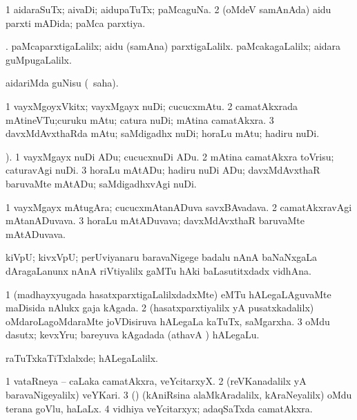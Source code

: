 \bentry
{}
\gl{\gu}
\bmng
\bnum
\num{1} aidaraSuTx; aivaDi; aidupaTuTx; paMcaguNa. 
\num{2} (oMdeV samAnAda) aidu parxti mADida; paMca parxtiya. 
\enum
\emng

\noindent
\gl{\pagu}
\expl{}
\bmng
{}. 
\banum
{} paMcaparxtigaLalilx; aidu (samAna) parxtigaLalilx. 
 paMcakagaLalilx; aidara guMpugaLalilx. 
\eanum
\emng
\eentry

\bentry
{}
\gl{\sakirx}
\expl{}
\bmng
aidariMda guNisu (\akirx\ saha). 
\emng
\eentry

\bentry
{}
\gl{\nA }
\bmng
\bnum
\num{1} vayxMgoyxVkitx; vayxMgayx nuDi; cucucxmAtu. 
\num{2} camatAkxrada mAtineVTu;curuku mAtu; catura nuDi; mAtina camatAkxra. 
\num{3} davxMdAvxthaRda mAtu; saMdigadhx nuDi; horaLu mAtu; hadiru nuDi. 
\enum
\emng
\eentry

\bentry
{}
\gl{\akirx}
).\bmng
\bnum
\num{1} vayxMgayx nuDi ADu; cucucxnuDi ADu. 
\num{2} mAtina camatAkxra toVrisu; caturavAgi nuDi. 
\num{3} horaLu mAtADu; hadiru nuDi ADu; davxMdAvxthaR baruvaMte mAtADu; saMdigadhxvAgi nuDi. 
\enum
\emng
\eentry

\bentry
{}
\gl{\nA}
\bmng
\bnum
\num{1} vayxMgayx mAtugAra; cucucxmAtanADuva savxBAvadava. 
\num{2} camatAkxravAgi mAtanADuvava. 
\num{3} horaLu mAtADuvava; davxMdAvxthaR baruvaMte mAtADuvava. 
\enum
\emng
\eentry

\bentry
{}
\gl{\nA}
\bmng
kiVpU; kivxVpU; perUviyanaru baravaNigege badalu nAnA baNaNxgaLa dAragaLanunx nAnA riVtiyalilx gaMTu hAki baLasutitxdadx vidhAna. 
\emng
\eentry

\bentry
{}
\gl{\nA}
\bmng
\bnum
\num{1} (madhayxyugada hasatxparxtigaLalilxdadxMte) eMTu hALegaLAguvaMte maDisida nAlukx gaja kAgada. 
\num{2} (hasatxparxtiyalilx yA pusatxkadalilx) oMdaroLagoMdaraMte joVDisiruva hALegaLa kaTuTx, saMgarxha. 
\num{3} oMdu dasutx; kevxYru; bareyuva kAgadada  (athavA ) hALegaLu. 
\enum
\emng

\noindent
\gl{\pagu}
\bmng
{} raTuTxkaTiTxlalxde; hALegaLalilx. 
\emng
\eentry

\bentry
{}
\gl{\nA}
\bmng
\bnum
\num{1} vataRneya -- caLaka camatAkxra, veYcitarxyX. 
\num{2} (reVKanadalilx yA baravaNigeyalilx) veYKari. 
\num{3} (\vAshi) (kAniRsina alaMkAradalilx, kAraNeyalilx) oMdu terana goVlu, haLaLx. 
\num{4} vidhiya veYcitarxyx; adaqSaTxda camatAkxra. 
\enum
\emng
\eentry

